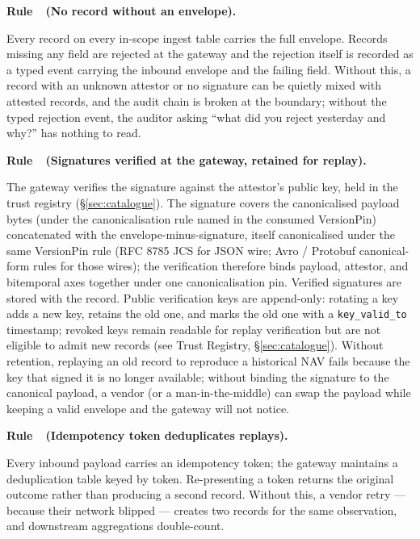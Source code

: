 \documentclass[11pt,a4paper]{article}
\newcounter{rul}
\newenvironment{rul}[1]{%
  \refstepcounter{rul}\par\medskip\noindent\textbf{Rule~\therul\ (#1).}\ %
}{\par\medskip}
\begin{document}
\begin{rul}{No record without an envelope}
Every record on every in-scope ingest table carries the full envelope. Records missing any field are rejected at the gateway and the rejection itself is recorded as a typed event carrying the inbound envelope and the failing field. Without this, a record with an unknown attestor or no signature can be quietly mixed with attested records, and the audit chain is broken at the boundary; without the typed rejection event, the auditor asking ``what did you reject yesterday and why?'' has nothing to read.
\end{rul}

\begin{rul}{Signatures verified at the gateway, retained for replay}
The gateway verifies the signature against the attestor's public key, held in the trust registry (\S\ref{sec:catalogue}). The signature covers the canonicalised payload bytes (under the canonicalisation rule named in the consumed VersionPin) concatenated with the envelope-minus-signature, itself canonicalised under the same VersionPin rule (RFC 8785 JCS for JSON wire; Avro / Protobuf canonical-form rules for those wires); the verification therefore binds payload, attestor, and bitemporal axes together under one canonicalisation pin. Verified signatures are stored with the record. Public verification keys are append-only: rotating a key adds a new key, retains the old one, and marks the old one with a \texttt{key\_valid\_to} timestamp; revoked keys remain readable for replay verification but are not eligible to admit new records (see Trust Registry, \S\ref{sec:catalogue}). Without retention, replaying an old record to reproduce a historical NAV fails because the key that signed it is no longer available; without binding the signature to the canonical payload, a vendor (or a man-in-the-middle) can swap the payload while keeping a valid envelope and the gateway will not notice.
\end{rul}

\begin{rul}{Idempotency token deduplicates replays}
Every inbound payload carries an idempotency token; the gateway maintains a deduplication table keyed by token. Re-presenting a token returns the original outcome rather than producing a second record. Without this, a vendor retry --- because their network blipped --- creates two records for the same observation, and downstream aggregations double-count.
\end{rul}
\end{document}
